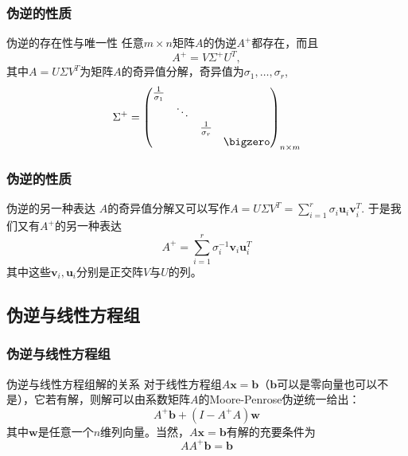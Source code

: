 
\begin{frame}
\frametitle{伪逆的性质}

\begin{block}{伪逆的存在性与唯一性}
任意$m\times n$矩阵$A$的伪逆$A^+$都存在，而且
\[A^+ = V\Sigma^+U^T,\]
其中$A = U\Sigma V^T$为矩阵$A$的奇异值分解，奇异值为$\sigma_1, \ldots, \sigma_r$,
\[\Sigma^+ = \begin{pmatrix}
\frac{1}{\sigma_1} & & & \\ & \ddots & & \\ & & \frac{1}{\sigma_r} & \\ & & & \bigzero \end{pmatrix}_{n\times m}\]
\end{block}

\end{frame}


\begin{frame}
\frametitle{伪逆的性质}

\begin{block}{伪逆的另一种表达}
$A$的奇异值分解又可以写作\(\displaystyle A = U\Sigma V^T = \sum\limits_{i=1}^r \sigma_i \mathbf{u}_i \mathbf{v}_i^T \). 于是我们又有$A^+$的另一种表达
\[A^+ = \sum\limits_{i=1}^r \sigma_i^{-1} \mathbf{v}_i \mathbf{u}_i^T\]
其中这些$\mathbf{v}_i, \mathbf{u}_i$分别是正交阵$V$与$U$的列。
\end{block}

\end{frame}


\subsection{伪逆与线性方程组}


\begin{frame}
\frametitle{伪逆与线性方程组}

\begin{block}{伪逆与线性方程组解的关系}
对于线性方程组$A\mathbf{x} = \mathbf{b}$（$\mathbf{b}$可以是零向量也可以不是），它若有解，则解可以由系数矩阵$A$的Moore-Penrose伪逆统一给出：
\[A^+\mathbf{b} + (I - A^+A)\mathbf{w}\]
其中$\mathbf{w}$是任意一个$n$维列向量。当然，$A\mathbf{x} = \mathbf{b}$有解的充要条件为
\[AA^+\mathbf{b} = \mathbf{b}\]
\end{block}

\end{frame}


